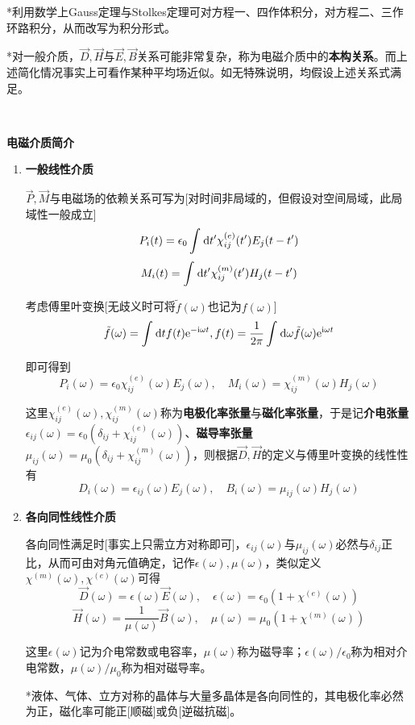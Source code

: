 \documentclass[a4paper,UTF8,fontset=windows]{ctexart}
\newcommand*{\dr}{\hspace{0.07em}\mathrm{d}}
\newcommand*{\er}{\mathrm{e}}
\newcommand*{\ir}{\mathrm{i}}
\newcommand*{\vb}{\vec{B}}
\newcommand*{\vd}{\vec{D}}
\newcommand*{\ve}{\vec{E}}
\newcommand*{\vh}{\vec{H}}
\newcommand*{\vm}{\vec{M}}
\newcommand*{\vp}{\vec{P}}
\begin{document}
*利用数学上Gauss定理与Stolkes定理可对方程一、四作体积分，对方程二、三作环路积分，从而改写为积分形式。

*对一般介质，$\vd,\vh$与$\ve,\vb$关系可能非常复杂，称为电磁介质中的\textbf{本构关系}。而上述简化情况事实上可看作某种平均场近似。如无特殊说明，均假设上述关系式满足。

\

\textbf{电磁介质简介}
\begin{enumerate}
    \item \textbf{一般线性介质}

    $\vp,\vm$与电磁场的依赖关系可写为[对时间非局域的，但假设对空间局域，此局域性一般成立]
    $$P_i(t)=\epsilon_0\int\dr t'\chi_{ij}^{(e)}(t')E_j(t-t')$$
    $$M_i(t)=\int\dr t'\chi_{ij}^{(m)}(t')H_j(t-t')$$

    考虑傅里叶变换[无歧义时可将$\tilde{f}(\omega)$也记为$f(\omega)$]
    $$\tilde{f}(\omega)=\int\dr tf(t)\er^{-\ir\omega t}, f(t)=\frac{1}{2\pi}\int\dr\omega\tilde{f}(\omega)\er^{\ir\omega t}$$

    即可得到
    $$P_i(\omega)=\epsilon_0\chi_{ij}^{(e)}(\omega)E_j(\omega),\quad M_i(\omega)=\chi_{ij}^{( m)}(\omega)H_j(\omega)$$

    这里$\chi_{ij}^{(e)}(\omega),\chi_{ij}^{(m)}(\omega)$称为\textbf{电极化率张量}与\textbf{磁化率张量}，于是记\textbf{介电张量}$\epsilon_{ij}(\omega)=\epsilon_0(\delta_{ij}+\chi_{ij}^{(e)}(\omega))$、\textbf{磁导率张量}$\mu_{ij}(\omega)=\mu_0(\delta_{ij}+\chi_{ij}^{(m)}(\omega))$，则根据$\vd,\vh$的定义与傅里叶变换的线性性有
    $$D_i(\omega)=\epsilon_{ij}(\omega)E_j(\omega),\quad B_i(\omega)=\mu_{ij}(\omega)H_j(\omega)$$

    \item \textbf{各向同性线性介质}
    
    各向同性满足时[事实上只需立方对称即可]，$\epsilon_{ij}(\omega)$与$\mu_{ij}(\omega)$必然与$\delta_{ij}$正比，从而可由对角元值确定，记作$\epsilon(\omega),\mu(\omega)$，类似定义$\chi^{(m)}(\omega),\chi^{(e)}(\omega)$可得
    $$\vd(\omega)=\epsilon(\omega)\ve(\omega),\quad\epsilon(\omega)=\epsilon_0(1+\chi^{(e)}(\omega))$$
    $$\vh(\omega)=\frac{1}{\mu(\omega)}\vb(\omega),\quad\mu(\omega)=\mu_0(1+\chi^{(m)}(\omega))$$

    这里$\epsilon(\omega)$记为介电常数或电容率，$\mu(\omega)$称为磁导率；$\epsilon(\omega)/\epsilon_0$称为相对介电常数，$\mu(\omega)/\mu_0$称为相对磁导率。

    *液体、气体、立方对称的晶体与大量多晶体是各向同性的，其电极化率必然为正，磁化率可能正[顺磁]或负[逆磁抗磁]。


\end{enumerate}
\end{document}
